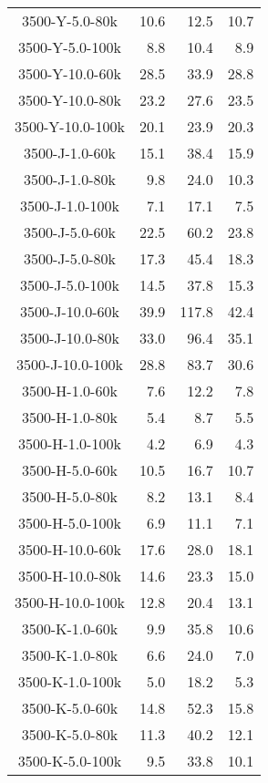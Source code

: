 \begin{longtable}{crrr}
    3500-Y-5.0-80k   &   10.6 &   12.5 &   10.7 \\
    3500-Y-5.0-100k  &    8.8 &   10.4 &    8.9 \\
    3500-Y-10.0-60k  &   28.5 &   33.9 &   28.8 \\
    3500-Y-10.0-80k  &   23.2 &   27.6 &   23.5 \\
    3500-Y-10.0-100k &   20.1 &   23.9 &   20.3 \\
    3500-J-1.0-60k   &   15.1 &   38.4 &   15.9 \\
    3500-J-1.0-80k   &    9.8 &   24.0 &   10.3 \\
    3500-J-1.0-100k  &    7.1 &   17.1 &    7.5 \\
    3500-J-5.0-60k   &   22.5 &   60.2 &   23.8 \\
    3500-J-5.0-80k   &   17.3 &   45.4 &   18.3 \\
    3500-J-5.0-100k  &   14.5 &   37.8 &   15.3 \\
    3500-J-10.0-60k  &   39.9 &  117.8 &   42.4 \\
    3500-J-10.0-80k  &   33.0 &   96.4 &   35.1 \\
    3500-J-10.0-100k &   28.8 &   83.7 &   30.6 \\
    3500-H-1.0-60k   &    7.6 &   12.2 &    7.8 \\
    3500-H-1.0-80k   &    5.4 &    8.7 &    5.5 \\
    3500-H-1.0-100k  &    4.2 &    6.9 &    4.3 \\
    3500-H-5.0-60k   &   10.5 &   16.7 &   10.7 \\
    3500-H-5.0-80k   &    8.2 &   13.1 &    8.4 \\
    3500-H-5.0-100k  &    6.9 &   11.1 &    7.1 \\
    3500-H-10.0-60k  &   17.6 &   28.0 &   18.1 \\
    3500-H-10.0-80k  &   14.6 &   23.3 &   15.0 \\
    3500-H-10.0-100k &   12.8 &   20.4 &   13.1 \\
    3500-K-1.0-60k   &    9.9 &   35.8 &   10.6 \\
    3500-K-1.0-80k   &    6.6 &   24.0 &    7.0 \\
    3500-K-1.0-100k  &    5.0 &   18.2 &    5.3 \\
    3500-K-5.0-60k   &   14.8 &   52.3 &   15.8 \\
    3500-K-5.0-80k   &   11.3 &   40.2 &   12.1 \\
    3500-K-5.0-100k  &    9.5 &   33.8 &   10.1 \\

\end{longtable}
